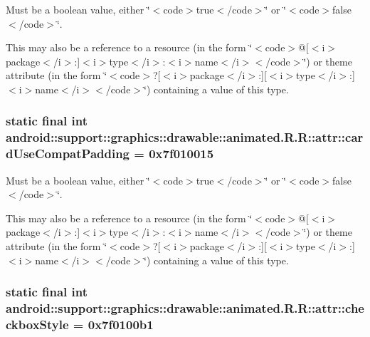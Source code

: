 Must be a boolean value, either \char`\"{}$<$code$>$true$<$/code$>$\char`\"{} or \char`\"{}$<$code$>$false$<$/code$>$\char`\"{}. 

This may also be a reference to a resource (in the form \char`\"{}$<$code$>$@\mbox{[}$<$i$>$package$<$/i$>$:\mbox{]}$<$i$>$type$<$/i$>$:$<$i$>$name$<$/i$>$$<$/code$>$\char`\"{}) or theme attribute (in the form \char`\"{}$<$code$>$?\mbox{[}$<$i$>$package$<$/i$>$:\mbox{]}\mbox{[}$<$i$>$type$<$/i$>$:\mbox{]}$<$i$>$name$<$/i$>$$<$/code$>$\char`\"{}) containing a value of this type. \hypertarget{classandroid_1_1support_1_1graphics_1_1drawable_1_1animated_1_1_r_1_1attr_9b8ee88055dd76f6ec4a3eb6ea010bc2}{
\subsubsection[{cardUseCompatPadding}]{\setlength{\rightskip}{0pt plus 5cm}static final int android::support::graphics::drawable::animated.R.R::attr::cardUseCompatPadding = 0x7f010015}}
\label{classandroid_1_1support_1_1graphics_1_1drawable_1_1animated_1_1_r_1_1attr_9b8ee88055dd76f6ec4a3eb6ea010bc2}


Must be a boolean value, either \char`\"{}$<$code$>$true$<$/code$>$\char`\"{} or \char`\"{}$<$code$>$false$<$/code$>$\char`\"{}. 

This may also be a reference to a resource (in the form \char`\"{}$<$code$>$@\mbox{[}$<$i$>$package$<$/i$>$:\mbox{]}$<$i$>$type$<$/i$>$:$<$i$>$name$<$/i$>$$<$/code$>$\char`\"{}) or theme attribute (in the form \char`\"{}$<$code$>$?\mbox{[}$<$i$>$package$<$/i$>$:\mbox{]}\mbox{[}$<$i$>$type$<$/i$>$:\mbox{]}$<$i$>$name$<$/i$>$$<$/code$>$\char`\"{}) containing a value of this type. \hypertarget{classandroid_1_1support_1_1graphics_1_1drawable_1_1animated_1_1_r_1_1attr_f7650b81e5f9eae5e167c84d6f05a0b8}{
\subsubsection[{checkboxStyle}]{\setlength{\rightskip}{0pt plus 5cm}static final int android::support::graphics::drawable::animated.R.R::attr::checkboxStyle = 0x7f0100b1}}
\label{classandroid_1_1support_1_1graphics_1_1drawable_1_1animated_1_1_r_1_1attr_f7650b81e5f9eae5e167c84d6f05a0b8}


